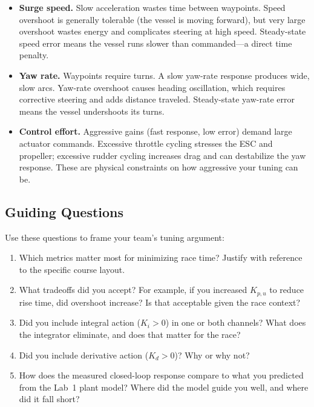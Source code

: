 \documentclass[../../book.tex]{subfiles}
\begin{document}
\begin{itemize}
  \item \textbf{Surge speed.}  Slow acceleration wastes time between waypoints.  Speed overshoot is generally tolerable (the vessel is moving forward), but very large overshoot wastes energy and complicates steering at high speed.  Steady-state speed error means the vessel runs slower than commanded---a direct time penalty.

  \item \textbf{Yaw rate.}  Waypoints require turns.  A slow yaw-rate response produces wide, slow arcs.  Yaw-rate overshoot causes heading oscillation, which requires corrective steering and adds distance traveled.  Steady-state yaw-rate error means the vessel undershoots its turns.

  \item \textbf{Control effort.}  Aggressive gains (fast response, low error) demand large actuator commands.  Excessive throttle cycling stresses the ESC and propeller; excessive rudder cycling increases drag and can destabilize the yaw response.  These are physical constraints on how aggressive your tuning can be.
\end{itemize}

\subsection{Guiding Questions}

Use these questions to frame your team's tuning argument:

\begin{enumerate}
  \item Which metrics matter most for minimizing race time?  Justify with reference to the specific course layout.
  \item What tradeoffs did you accept?  For example, if you increased $K_{p,u}$ to reduce rise time, did overshoot increase?  Is that acceptable given the race context?
  \item Did you include integral action ($K_i > 0$) in one or both channels?  What does the integrator eliminate, and does that matter for the race?
  \item Did you include derivative action ($K_d > 0$)?  Why or why not?
  \item How does the measured closed-loop response compare to what you predicted from the Lab~1 plant model?  Where did the model guide you well, and where did it fall short?
\end{enumerate}
\end{document}
